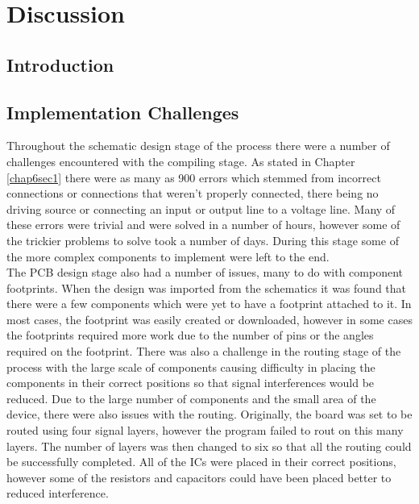
\chapter{Discussion} %

\label{Chapter7} %

\section{Introduction}

\section{Implementation Challenges}

	Throughout the schematic design stage of the process there were a number of challenges encountered with the compiling stage. 
As stated in Chapter \ref{chap6sec1} there were as many as 900 errors which stemmed from incorrect connections or connections that weren't properly connected, there being no driving source or connecting an input or output line to a voltage line. 
Many of these errors were trivial and were solved in a number of hours, however some of the trickier problems to solve took a number of days. 
During this stage some of the more complex components to implement were left to the end.\\

	The PCB design stage also had a number of issues, many to do with component footprints. 
When the design was imported from the schematics it was found that there were a few components which were yet to have a footprint attached to it. 
In most cases, the footprint was easily created or downloaded, however in some cases the footprints required more work due to the number of pins or the angles required on the footprint. 
There was also a challenge in the routing stage of the process with the large scale of components causing difficulty in placing the components in their correct positions so that signal interferences would be reduced. 
Due to the large number of components and the small area of the device, there were also issues with the routing. 
Originally, the board was set to be routed using four signal layers, however the program failed to rout on this many layers.
The number of layers was then changed to six so that all the routing could be successfully completed. 
All of the ICs were placed in their correct positions, however some of the resistors and capacitors could have been placed better to reduced interference. \\

